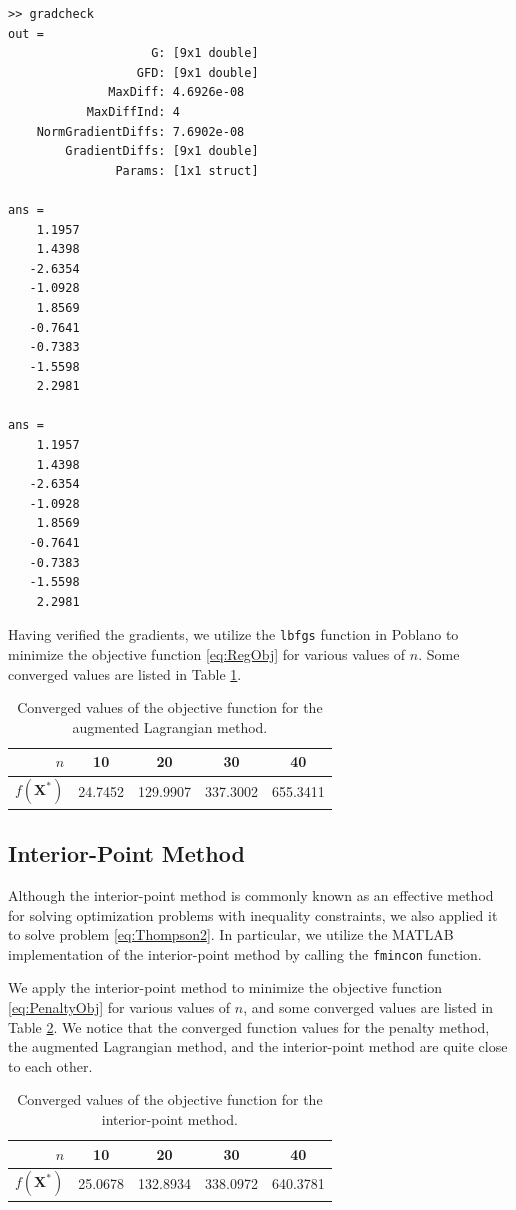\documentclass[11pt]{article}
\begin{document}
\begin{verbatim}
>> gradcheck
out = 
                    G: [9x1 double]
                  GFD: [9x1 double]
              MaxDiff: 4.6926e-08
           MaxDiffInd: 4
    NormGradientDiffs: 7.6902e-08
        GradientDiffs: [9x1 double]
               Params: [1x1 struct]

ans =
    1.1957
    1.4398
   -2.6354
   -1.0928
    1.8569
   -0.7641
   -0.7383
   -1.5598
    2.2981

ans =
    1.1957
    1.4398
   -2.6354
   -1.0928
    1.8569
   -0.7641
   -0.7383
   -1.5598
    2.2981
\end{verbatim}

\noindent Having verified the gradients, we utilize the \texttt{lbfgs} function in Poblano to minimize the objective function \eqref{eq:RegObj} for various values of $n$. Some converged values are listed in Table \ref{tb:ObjAugLag}.

\begin{table}[!htb]
  \centering
  \begin{tabular}{rcccc}
	\toprule
	$n$ & 10 & 20 & 30 & 40 \\
	\midrule
	$f(\bm{X}^*)$ & 24.7452 & 129.9907 & 337.3002 & 655.3411 \\
	\bottomrule
  \end{tabular}
  \caption{Converged values of the objective function for the augmented Lagrangian method.}\label{tb:ObjAugLag}
\end{table}

\subsection{Interior-Point Method}

Although the interior-point method is commonly known as an effective method for solving optimization problems with inequality constraints, we also applied it to solve problem \eqref{eq:Thompson2}. In particular, we utilize the MATLAB implementation of the interior-point method by calling the \texttt{fmincon} function.

We apply the interior-point method to minimize the objective function \eqref{eq:PenaltyObj} for various values of $n$, and some converged values are listed in Table \ref{tb:ObjIntPt}. We notice that the converged function values for the penalty method, the augmented Lagrangian method, and the interior-point method are quite close to each other.

\begin{table}[ht]
  \centering
  \begin{tabular}{rcccc}
	\toprule
	$n$ & 10 & 20 & 30 & 40 \\
	\midrule
	$f(\bm{X}^*)$ & 25.0678 & 132.8934 & 338.0972 & 640.3781 \\
	\bottomrule
  \end{tabular}
  \caption{Converged values of the objective function for the interior-point method.}\label{tb:ObjIntPt}
\end{table}
\end{document}
